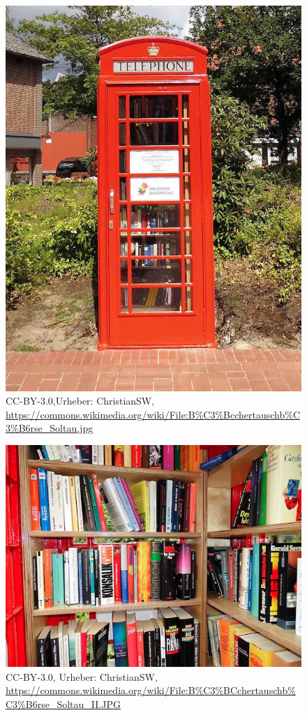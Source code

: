\documentclass[a4paper,
fontsize=11pt,
oneside,
numbers=noperiodatend,
parskip=half-,
bibliography=totoc,
final
]{scrartcl}
\begin{document}
\begin{figure}[htbp]
\centering
\includegraphics{img/BuchertauschborseSoltau.jpg}
\caption{CC-BY-3.0,Urheber: ChristianSW,
\url{https://commons.wikimedia.org/wiki/File:B\%C3\%Bcchertauschb\%C3\%B6rse_Soltau.jpg}}
\end{figure}

\begin{figure}[htbp]
\centering
\includegraphics{img/BuchertauschborseSoltauII.jpg}
\caption{CC-BY-3.0, Urheber: ChristianSW,
\url{https://commons.wikimedia.org/wiki/File:B\%C3\%BCchertauschb\%C3\%B6rse_Soltau_II.JPG}}
\end{figure}
\end{document}
